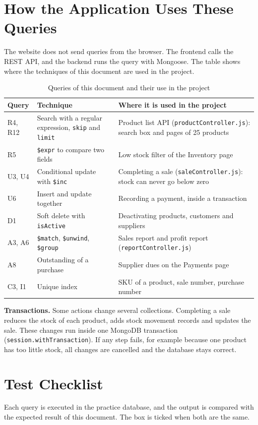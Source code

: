 \documentclass[11pt,a4paper]{article}
\newcommand{\code}[1]{\texttt{#1}}
\begin{document}
\section{How the Application Uses These Queries}
The website does not send queries from the browser. The frontend calls the REST API, and the backend runs the query with Mongoose. The table shows where the techniques of this document are used in the project.

\begin{table}[h]
\centering
\begin{tabularx}{\textwidth}{@{}P{1.6cm}P{5.2cm}Y@{}}
\toprule
\textbf{Query} & \textbf{Technique} & \textbf{Where it is used in the project} \\
\midrule
R4, R12 & Search with a regular expression, \code{skip} and \code{limit} & Product list API (\code{productController.js}): search box and pages of 25 products \\
R5 & \code{\$expr} to compare two fields & Low stock filter of the Inventory page \\
U3, U4 & Conditional update with \code{\$inc} & Completing a sale (\code{saleController.js}): stock can never go below zero \\
U6 & Insert and update together & Recording a payment, inside a transaction \\
D1 & Soft delete with \code{isActive} & Deactivating products, customers and suppliers \\
A3, A6 & \code{\$match}, \code{\$unwind}, \code{\$group} & Sales report and profit report (\code{reportController.js}) \\
A8 & Outstanding of a purchase & Supplier dues on the Payments page \\
C3, I1 & Unique index & SKU of a product, sale number, purchase number \\
\bottomrule
\end{tabularx}
\caption{Queries of this document and their use in the project}
\end{table}

\textbf{Transactions.} Some actions change several collections. Completing a sale reduces the stock of each product, adds stock movement records and updates the sale. These changes run inside one MongoDB transaction (\code{session.withTransaction}). If any step fails, for example because one product has too little stock, all changes are cancelled and the database stays correct.

\section{Test Checklist}
Each query is executed in the practice database, and the output is compared with the expected result of this document. The box is ticked when both are the same.
\end{document}
